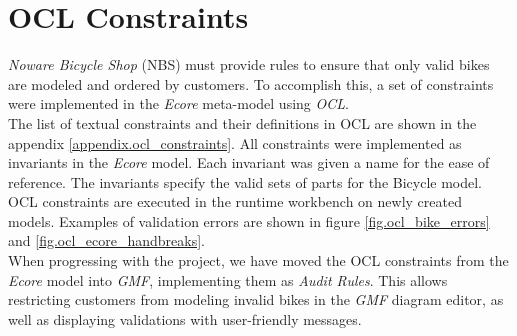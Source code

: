\section{OCL Constraints}
\label{sec.ocl_constraints}

\noindent \emph{Noware Bicycle Shop} (NBS) must provide rules to ensure that
only valid bikes are modeled and ordered by customers. To accomplish this, a 
set of constraints were implemented in the \emph{Ecore} meta-model using \emph{OCL}.\\

\noindent The list of textual constraints and their definitions in OCL are
shown in the appendix \ref{appendix.ocl_constraints}. All constraints were
implemented as invariants in the \emph{Ecore} model. Each invariant was given
a name for the ease of reference. The invariants specify the valid sets
of parts for the Bicycle model. OCL constraints are executed in the runtime
workbench on newly created models. Examples of validation errors are shown in
figure \ref{fig.ocl_bike_errors} and \ref{fig.ocl_ecore_handbreaks}.\\

\noindent When progressing with the project, we have moved the OCL constraints
from the \emph{Ecore} model into \emph{GMF}, implementing them as \emph{Audit
Rules}. This allows restricting customers from modeling invalid bikes in the \emph{GMF} diagram
editor, as well as displaying validations with user-friendly
messages.\\



